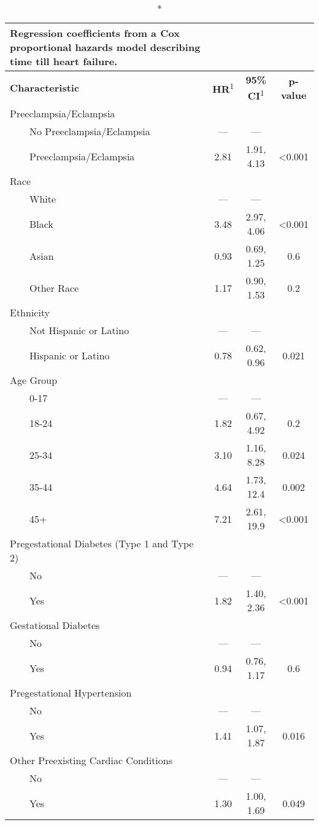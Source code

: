 \setlength{\LTpost}{0mm}
\begin{longtable}{lccc}
\caption*{
{\large \textbf{Regression coefficients from a Cox proportional hazards model describing time till heart failure.}}
} \\ 
\toprule
\textbf{Characteristic} & \textbf{HR}\textsuperscript{1} & \textbf{95\% CI}\textsuperscript{1} & \textbf{p-value} \\ 
\midrule
Preeclampsia/Eclampsia &  &  &  \\ 
    No Preeclampsia/Eclampsia & — & — &  \\ 
    Preeclampsia/Eclampsia & 2.81 & 1.91, 4.13 & <0.001 \\ 
Race &  &  &  \\ 
    White & — & — &  \\ 
    Black & 3.48 & 2.97, 4.06 & <0.001 \\ 
    Asian & 0.93 & 0.69, 1.25 & 0.6 \\ 
    Other Race & 1.17 & 0.90, 1.53 & 0.2 \\ 
Ethnicity &  &  &  \\ 
    Not Hispanic or Latino & — & — &  \\ 
    Hispanic or Latino & 0.78 & 0.62, 0.96 & 0.021 \\ 
Age Group &  &  &  \\ 
    0-17 & — & — &  \\ 
    18-24 & 1.82 & 0.67, 4.92 & 0.2 \\ 
    25-34 & 3.10 & 1.16, 8.28 & 0.024 \\ 
    35-44 & 4.64 & 1.73, 12.4 & 0.002 \\ 
    45+ & 7.21 & 2.61, 19.9 & <0.001 \\ 
Pregestational Diabetes (Type 1 and Type 2) &  &  &  \\ 
    No & — & — &  \\ 
    Yes & 1.82 & 1.40, 2.36 & <0.001 \\ 
Gestational Diabetes &  &  &  \\ 
    No & — & — &  \\ 
    Yes & 0.94 & 0.76, 1.17 & 0.6 \\ 
Pregestational Hypertension &  &  &  \\ 
    No & — & — &  \\ 
    Yes & 1.41 & 1.07, 1.87 & 0.016 \\ 
Other Preexisting Cardiac Conditions &  &  &  \\ 
    No & — & — &  \\ 
    Yes & 1.30 & 1.00, 1.69 & 0.049 \\ 

\end{longtable}
